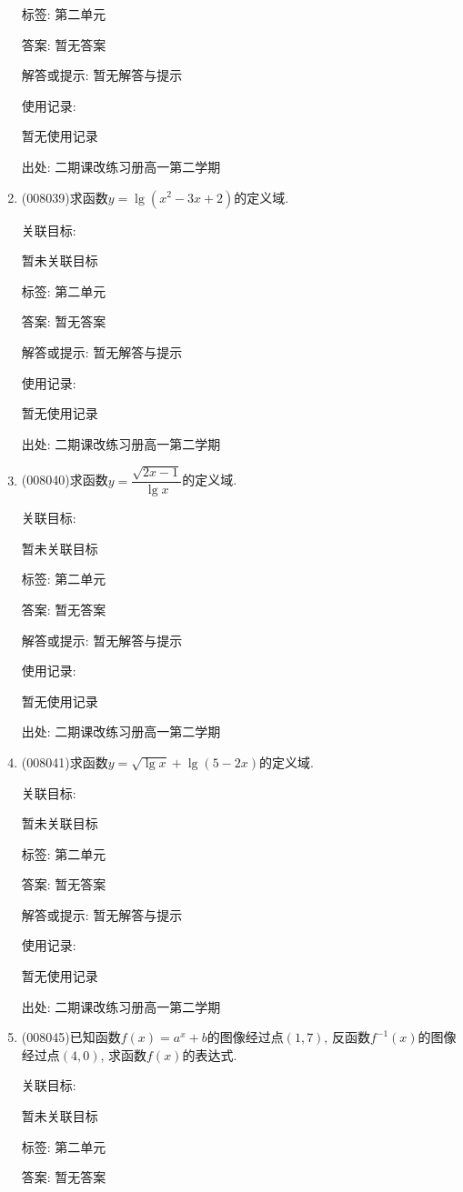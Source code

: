 \documentclass[10pt,a4paper]{article}
\begin{document}
\begin{enumerate}[1.]
标签: 第二单元

答案: 暂无答案

解答或提示: 暂无解答与提示

使用记录:

暂无使用记录


出处: 二期课改练习册高一第二学期
\item { (008039)}求函数$y=\lg (x^2-3x+2)$的定义域.


关联目标:

暂未关联目标



标签: 第二单元

答案: 暂无答案

解答或提示: 暂无解答与提示

使用记录:

暂无使用记录


出处: 二期课改练习册高一第二学期
\item { (008040)}求函数$y=\dfrac{\sqrt {2x-1}}{\lg x}$的定义域.


关联目标:

暂未关联目标



标签: 第二单元

答案: 暂无答案

解答或提示: 暂无解答与提示

使用记录:

暂无使用记录


出处: 二期课改练习册高一第二学期
\item { (008041)}求函数$y=\sqrt {\lg x}+\lg (5-2x)$的定义域.


关联目标:

暂未关联目标



标签: 第二单元

答案: 暂无答案

解答或提示: 暂无解答与提示

使用记录:

暂无使用记录


出处: 二期课改练习册高一第二学期
\item { (008045)}已知函数$f(x)=a^x+b$的图像经过点$(1, 7)$, 反函数$f^{-1}(x)$的图像经过点$(4, 0)$, 求函数$f(x)$的表达式.


关联目标:

暂未关联目标



标签: 第二单元

答案: 暂无答案


\end{enumerate}
\end{document}
